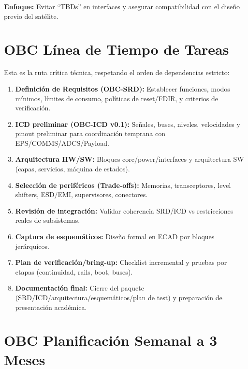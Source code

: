 \textbf{Enfoque:} Evitar “TBDs” en interfaces y asegurar compatibilidad con el diseño previo del satélite.

\chapter{OBC Línea de Tiempo de Tareas}

Esta es la ruta crítica técnica, respetando el orden de dependencias estricto:

\begin{enumerate}
  \item \textbf{Definición de Requisitos (OBC-SRD):} Establecer funciones, modos mínimos, límites de consumo, políticas de reset/FDIR, y criterios de verificación.
  \item \textbf{ICD preliminar (OBC-ICD v0.1):} Señales, buses, niveles, velocidades y pinout preliminar para coordinación temprana con EPS/COMMS/ADCS/Payload.
  \item \textbf{Arquitectura HW/SW:} Bloques core/power/interfaces y arquitectura SW (capas, servicios, máquina de estados).
  \item \textbf{Selección de periféricos (Trade-offs):} Memorias, transceptores, level shifters, ESD/EMI, supervisores, conectores.
  \item \textbf{Revisión de integración:} Validar coherencia SRD/ICD vs restricciones reales de subsistemas.
  \item \textbf{Captura de esquemáticos:} Diseño formal en ECAD por bloques jerárquicos.
  \item \textbf{Plan de verificación/bring-up:} Checklist incremental y pruebas por etapas (continuidad, rails, boot, buses).
  \item \textbf{Documentación final:} Cierre del paquete (SRD/ICD/arquitectura/esquemáticos/plan de test) y preparación de presentación académica.
\end{enumerate}

\chapter{OBC Planificación Semanal a 3 Meses}


